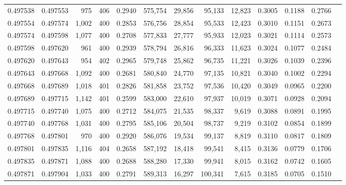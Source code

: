 \begin{tabular}{rrrrrrrrrrrrr}
0.497538 & 0.497553 &   975 & 406 &                                     0.2940 & 575,754 &  29,856 &  95,133 &  12,823 & 0.3005 & 0.1188 & 0.2766 \\
0.497554 & 0.497574 & 1,002 & 400 &                                     0.2853 & 576,756 &  28,854 &  95,533 &  12,423 & 0.3010 & 0.1151 & 0.2673 \\
0.497574 & 0.497598 & 1,077 & 400 &                                     0.2708 & 577,833 &  27,777 &  95,933 &  12,023 & 0.3021 & 0.1114 & 0.2573 \\
0.497598 & 0.497620 &   961 & 400 &                                     0.2939 & 578,794 &  26,816 &  96,333 &  11,623 & 0.3024 & 0.1077 & 0.2484 \\
0.497620 & 0.497643 &   954 & 402 &                                     0.2965 & 579,748 &  25,862 &  96,735 &  11,221 & 0.3026 & 0.1039 & 0.2396 \\
0.497643 & 0.497668 & 1,092 & 400 &                                     0.2681 & 580,840 &  24,770 &  97,135 &  10,821 & 0.3040 & 0.1002 & 0.2294 \\
0.497668 & 0.497689 & 1,018 & 401 &                                     0.2826 & 581,858 &  23,752 &  97,536 &  10,420 & 0.3049 & 0.0965 & 0.2200 \\
0.497689 & 0.497715 & 1,142 & 401 &                                     0.2599 & 583,000 &  22,610 &  97,937 &  10,019 & 0.3071 & 0.0928 & 0.2094 \\
0.497715 & 0.497740 & 1,075 & 400 &                                     0.2712 & 584,075 &  21,535 &  98,337 &   9,619 & 0.3088 & 0.0891 & 0.1995 \\
0.497740 & 0.497768 & 1,031 & 400 &                                     0.2795 & 585,106 &  20,504 &  98,737 &   9,219 & 0.3102 & 0.0854 & 0.1899 \\
0.497768 & 0.497801 &   970 & 400 &                                     0.2920 & 586,076 &  19,534 &  99,137 &   8,819 & 0.3110 & 0.0817 & 0.1809 \\
0.497801 & 0.497835 & 1,116 & 404 &                                     0.2658 & 587,192 &  18,418 &  99,541 &   8,415 & 0.3136 & 0.0779 & 0.1706 \\
0.497835 & 0.497871 & 1,088 & 400 &                                     0.2688 & 588,280 &  17,330 &  99,941 &   8,015 & 0.3162 & 0.0742 & 0.1605 \\
0.497871 & 0.497904 & 1,033 & 400 &                                     0.2791 & 589,313 &  16,297 & 100,341 &   7,615 & 0.3185 & 0.0705 & 0.1510 \\

\end{tabular}
